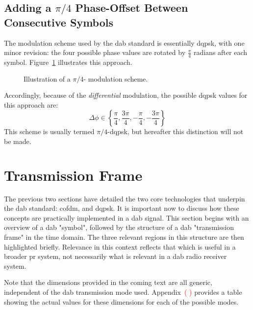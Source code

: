 \documentclass[class=report,11pt,crop=false]{standalone}
\begin{document}
\subsection{Adding a $\pi/4$ Phase-Offset Between Consecutive Symbols}
The modulation scheme used by the \gls{dab} standard is essentially \gls{dqpsk}, with one minor revision: the four possible phase values are rotated by \(\frac{\pi}{4}\) radians after each symbol. Figure~\ref{fig:pi-by-4-dqpsk-illustration} illustrates this approach.

\begin{figure}[htbp]
    \centering
    \captionsetup{type=figure}
    \def\svgwidth{1\linewidth}
    { %
    \scriptsize
    }
    \caption{Illustration of a \(\pi/4\)- modulation scheme.}
    \label{fig:pi-by-4-dqpsk-illustration}
\end{figure}

Accordingly, because of the \emph{differential} modulation, the possible \gls{dqpsk} values for this approach are:
\begin{equation}
    \Delta\phi \in \left\{ \frac{\pi}{4}, \frac{3\pi}{4}, -\frac{\pi}{4}, -\frac{3\pi}{4} \right\}
\end{equation}
This scheme is usually termed \(\pi/4\)-\gls{dqpsk}, but hereafter this distinction will not be made.

\section{Transmission Frame}
The previous two sections have detailed the two core technologies that underpin the \gls{dab} standard: \gls{cofdm}, and \gls{dqpsk}. It is important now to discuss how these concepts are practically implemented in a \gls{dab} signal. This section begins with an overview of a \gls{dab} "symbol", followed by the structure of a \gls{dab} "transmission frame" in the time domain. The three relevant regions in this structure are then highlighted briefly. Relevance in this context reflects that which is useful in a broader \gls{pr} system, not necessarily what is relevant in a \gls{dab} radio receiver system.

Note that the dimensions provided in the coming text are all generic, independent of the \gls{dab} transmission mode used. Appendix~\textcolor{red}{( )} provides a table showing the actual values for these dimensions for each of the possible modes.
\end{document}
